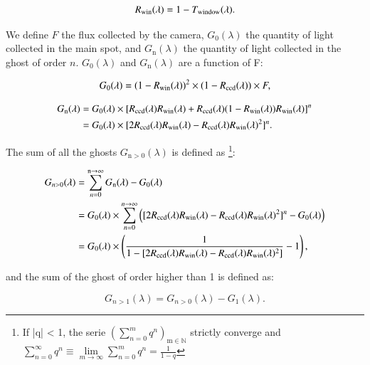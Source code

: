 \begin{equation}
    R_{\mathrm{win}}(\lambda) = 1 - T_\mathrm{window}(\lambda).
    \label{eq:rwindow}
\end{equation}
 
\noindent We define $F$ the flux collected by the camera, $G_0(\lambda)$ the quantity of light collected in the main spot, and $G_\mathrm{n}(\lambda)$ the quantity of light collected in the ghost of order $n$. $G_0(\lambda)$ and $G_\mathrm{n}(\lambda)$ are a function of F: 

\begin{equation}
     G_0(\lambda) = (1-R_{\mathrm{win}}(\lambda))^{2} \times (1-R_{\mathrm{ccd}}(\lambda)) \times F, 
     \label{eq:g0}
\end{equation}

\begin{equation}
\begin{aligned}
    G_\mathrm{n}(\lambda) & = G_{0}(\lambda) \times [R_{\mathrm{ccd}}(\lambda) R_{\mathrm{win}}(\lambda) + R_{\mathrm{ccd}}(\lambda)(1-R_{\mathrm{win}}(\lambda))R_{\mathrm{win}}(\lambda)]^{n} \\
    & = G_{0}(\lambda) \times [2 R_{\mathrm{ccd}}(\lambda) R_{\mathrm{win}}(\lambda) - R_{\mathrm{ccd}}(\lambda) R_{\mathrm{win}}(\lambda)^{2}] ^{n}. \\
     \label{eq:gn}
\end{aligned}
\end{equation}

\noindent The sum of all the ghosts $G_{\mathrm{n>0}}(\lambda)$ is defined as
\footnote{If |q| < 1, the serie $\left( \sum_{n=0}^{m} q^n \right)_{\mathrm{m \in \mathbb{N}}}$ strictly converge and \\ $\sum_{n=0}^{\infty} q^n \equiv \lim\limits_{m \rightarrow \infty} \sum_{n=0}^{m} q^n = \frac{1}{1-q}$}:

 \begin{equation}
 \begin{aligned}
     G_{n>0}(\lambda) & = \sum_{n=0}^{\mathrm{n} \rightarrow \infty} G_\mathrm{n}(\lambda) - G_0(\lambda) \\
     & = G_0(\lambda) \times \sum_{n=0}^{n \rightarrow \infty} \left( [2 R_{\mathrm{ccd}}(\lambda) R_{\mathrm{win}}(\lambda) - R_{\mathrm{ccd}}(\lambda) R_{\mathrm{win}}(\lambda)^{2}] ^{n} - G_0(\lambda) \right)\\
     & = G_0(\lambda) \times\left( \frac{1}{1- [2 R_{\mathrm{ccd}}(\lambda) R_{\mathrm{win}}(\lambda) - R_{\mathrm{ccd}}(\lambda) R_{\mathrm{win}}(\lambda)^{2}]} - 1\right),
     \label{eq:sum_ghost}
 \end{aligned}
 \end{equation}
 
\noindent and the sum of the ghost of order higher than 1 is defined as:

 \begin{equation}
     G_{n>1}(\lambda) = G_{n>0}(\lambda) - G_1(\lambda).
     \label{eq:sum_ghost_sup_1}
 \end{equation}

